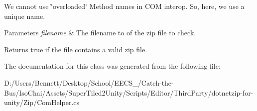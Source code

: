We cannot use \char`\"{}overloaded\char`\"{} Method names in C\+OM interop. So, here, we use a unique name. 


\begin{DoxyParams}{Parameters}
{\em filename} & The filename to of the zip file to check.\\
\hline
\end{DoxyParams}
\begin{DoxyReturn}{Returns}
true if the file contains a valid zip file.
\end{DoxyReturn}


The documentation for this class was generated from the following file\+:\begin{DoxyCompactItemize}
\item 
D\+:/\+Users/\+Bennett/\+Desktop/\+School/\+E\+E\+C\+S\+\_/\+Catch-\/the-\/\+Bus/\+Iso\+Chai/\+Assets/\+Super\+Tiled2\+Unity/\+Scripts/\+Editor/\+Third\+Party/dotnetzip-\/for-\/unity/\+Zip/Com\+Helper.\+cs\end{DoxyCompactItemize}
